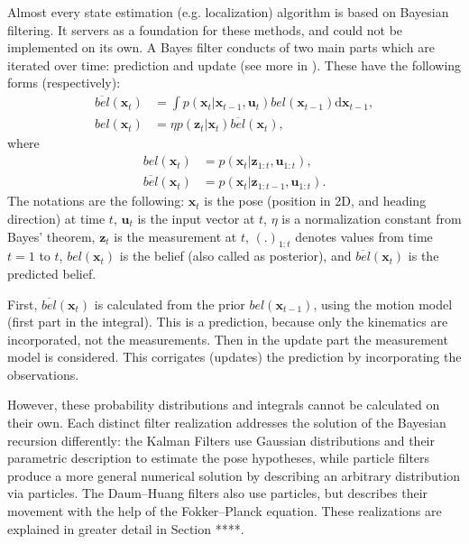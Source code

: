Almost every state estimation (e.g. localization) algorithm is based on Bayesian filtering.
It servers as a foundation for these methods, and could not be implemented on its own.
A Bayes filter conducts of two main parts which are iterated over time: prediction and update (see more in \cite{Thrun2005}).
These have the following forms (respectively):
\begin{align}\label{key}
    \overline{bel}(\mathbf{x}_t) & = \int p(\mathbf{x}_t | \mathbf{x}_{t-1},\mathbf{u}_t)bel(\mathbf{x}_{t-1})\mathrm{d}\mathbf{x}_{t-1}, \\
    bel(\mathbf{x}_t)            & = \eta p(\mathbf{\mathbf{z}}_t | \mathbf{x}_t)\overline{bel}(\mathbf{x}_t),
\end{align}
where
\begin{align}\label{key}
    bel(\mathbf{x}_t)            & = p(\mathbf{x}_t|\mathbf{z}_{1:t},\mathbf{u}_{1:t}),                      \\
    \overline{bel}(\mathbf{x}_t) & = p(\mathbf{x}_t|\mathbf{z}_{1:t-1},\mathbf{u}_{1:t}) \label{eq:predbel}.
\end{align}
The notations are the following: $\mathbf{x}_t$ is the pose (position in 2D, and heading direction) at time $t$,
$\mathbf{u}_t$ is the input vector at $t$, $\eta$ is a normalization constant from  Bayes' theorem,
$\mathbf{z}_t$ is the measurement at $t$, $(.)_{1:t}$ denotes values from time $t = 1$ to $t$,
$bel(\mathbf{x}_t)$ is the belief (also called as posterior), and  $\overline{bel}(\mathbf{x}_t)$ is the predicted belief.

First, $\overline{bel}(\mathbf{x}_t)$ is calculated from the prior $bel(\mathbf{x}_{t-1})$, using the motion model (first part in the integral).
This is a prediction, because only the kinematics are incorporated, not the measurements.
Then in the update part the measurement model is considered.
This corrigates (updates) the prediction by incorporating the observations.

However, these probability distributions and integrals cannot be calculated on their own.
Each distinct filter realization addresses the solution of the Bayesian recursion differently:
the Kalman Filters use Gaussian distributions and their parametric description to estimate the pose hypotheses,
while particle filters produce a more general numerical solution by describing an arbitrary distribution via particles.
The Daum--Huang filters also use particles, but describes their movement with the help of the Fokker--Planck equation.
These realizations are explained in greater detail in Section ****.

